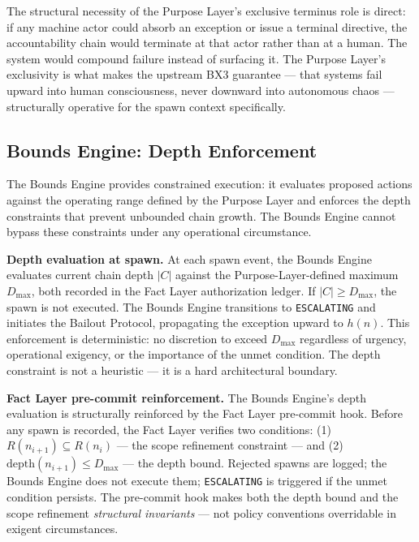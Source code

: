 \medskip
The structural necessity of the Purpose Layer's exclusive terminus role is direct: if any machine actor could absorb an exception or issue a terminal directive, the accountability chain would terminate at that actor rather than at a human. The system would compound failure instead of surfacing it. The Purpose Layer's exclusivity is what makes the upstream BX3 guarantee — that systems fail upward into human consciousness, never downward into autonomous chaos — structurally operative for the spawn context specifically.

\subsection{Bounds Engine: Depth Enforcement}
\label{sec:rs-bounds-depth}

The Bounds Engine provides constrained execution: it evaluates proposed actions against the operating range defined by the Purpose Layer and enforces the depth constraints that prevent unbounded chain growth. The Bounds Engine cannot bypass these constraints under any operational circumstance.

\medskip
\noindent\textbf{Depth evaluation at spawn.} At each spawn event, the Bounds Engine evaluates current chain depth $|C|$ against the Purpose-Layer-defined maximum $D_{\mathrm{max}}$, both recorded in the Fact Layer authorization ledger. If $|C| \geq D_{\mathrm{max}}$, the spawn is not executed. The Bounds Engine transitions to \texttt{ESCALATING} and initiates the Bailout Protocol, propagating the exception upward to $h(n)$. This enforcement is deterministic: no discretion to exceed $D_{\mathrm{max}}$ regardless of urgency, operational exigency, or the importance of the unmet condition. The depth constraint is not a heuristic — it is a hard architectural boundary.

\medskip
\noindent\textbf{Fact Layer pre-commit reinforcement.} The Bounds Engine's depth evaluation is structurally reinforced by the Fact Layer pre-commit hook. Before any spawn is recorded, the Fact Layer verifies two conditions: (1) $R(n_{i+1}) \subseteq R(n_i)$ — the scope refinement constraint — and (2) $\mathrm{depth}(n_{i+1}) \leq D_{\mathrm{max}}$ — the depth bound. Rejected spawns are logged; the Bounds Engine does not execute them; \texttt{ESCALATING} is triggered if the unmet condition persists. The pre-commit hook makes both the depth bound and the scope refinement \emph{structural invariants} — not policy conventions overridable in exigent circumstances.

